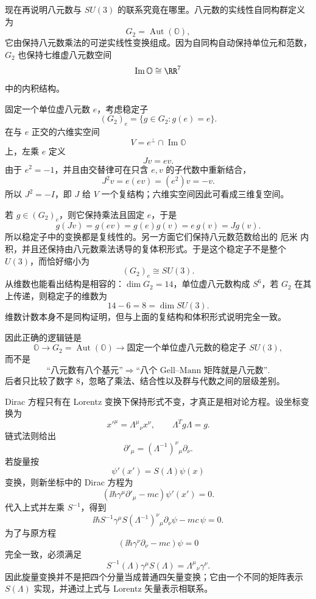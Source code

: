 现在再说明八元数与 $SU(3)$ 的联系究竟在哪里。八元数的实线性自同构群定义为
\[
G_2=\operatorname{Aut}(\mathbb O),
\]
它由保持八元数乘法的可逆实线性变换组成。因为自同构自动保持单位元和范数，$G_2$ 也保持七维虚八元数空间
\[
\operatorname{Im}\mathbb O\cong\RR^7
\]
中的内积结构。

固定一个单位虚八元数 $e$，考虑稳定子
\[
(G_2)_e
=\{g\in G_2:g(e)=e\}.
\]
在与 $e$ 正交的六维实空间
\[
V=e^\perp\cap\operatorname{Im}\mathbb O
\]
上，左乘 $e$ 定义
\[
Jv=ev.
\]
由于 $e^2=-1$，并且由交替律可在只含 $e,v$ 的子代数中重新结合，
\[
J^2v=e(ev)=(e^2)v=-v.
\]
所以 $J^2=-I$，即 $J$ 给 $V$ 一个复结构；六维实空间因此可看成三维复空间。

若 $g\in(G_2)_e$，则它保持乘法且固定 $e$，于是
\[
g(Jv)=g(ev)=g(e)g(v)=e\,g(v)=Jg(v).
\]
所以稳定子中的变换都是复线性的。另一方面它们保持八元数范数给出的 厄米 内积，并且还保持由八元数乘法诱导的复体积形式。于是这个稳定子不是整个 $U(3)$，而恰好缩小为
\begin{equation*}{(G_2)_e\cong SU(3).}\end{equation*}
从维数也能看出结构是相容的：$\dim G_2=14$，单位虚八元数构成 $S^6$，若 $G_2$ 在其上传递，则稳定子的维数为
\[
14-6=8=\dim SU(3).
\]
维数计数本身不是同构证明，但与上面的复结构和体积形式说明完全一致。

因此正确的逻辑链是
\[
\mathbb O
\longrightarrow
G_2=\operatorname{Aut}(\mathbb O)
\longrightarrow
\text{固定一个单位虚八元数的稳定子 }SU(3),
\]
而不是
\[
\text{“八元数有八个基元”}
\Longrightarrow
\text{“八个 Gell--Mann 矩阵就是八元数”}.
\]
后者只比较了数字 $8$，忽略了乘法、结合性以及群与代数之间的层级差别。

Dirac 方程只有在 Lorentz 变换下保持形式不变，才真正是相对论方程。设坐标变换为
\[
x'^\mu=\Lambda^\mu{}_{\nu}x^\nu,
\qquad
\Lambda^Tg\Lambda=g.
\]
链式法则给出
\[
\partial'_\mu=(\Lambda^{-1})^\nu{}_{\mu}\partial_\nu.
\]
若旋量按
\[
\psi'(x')=S(\Lambda)\psi(x)
\]
变换，则新坐标中的 Dirac 方程为
\[
(\ii\hbar\gamma^\mu\partial'_\mu-mc)\psi'(x')=0.
\]
代入上式并左乘 $S^{-1}$，得到
\[
\ii\hbar S^{-1}\gamma^\mu S(\Lambda^{-1})^\nu{}_{\mu}\partial_\nu\psi-mc\,\psi=0.
\]
为了与原方程
\[
(\ii\hbar\gamma^\nu\partial_\nu-mc)\psi=0
\]
完全一致，必须满足
\begin{equation}
{
S^{-1}(\Lambda)\gamma^\mu S(\Lambda)
=\Lambda^\mu{}_{\nu}\gamma^\nu
}.
\label{eq:spinor-lorentz-intertwiner}
\end{equation}
因此旋量变换并不是把四个分量当成普通四矢量变换；它由一个不同的矩阵表示 $S(\Lambda)$ 实现，并通过上式与 Lorentz 矢量表示相联系。

